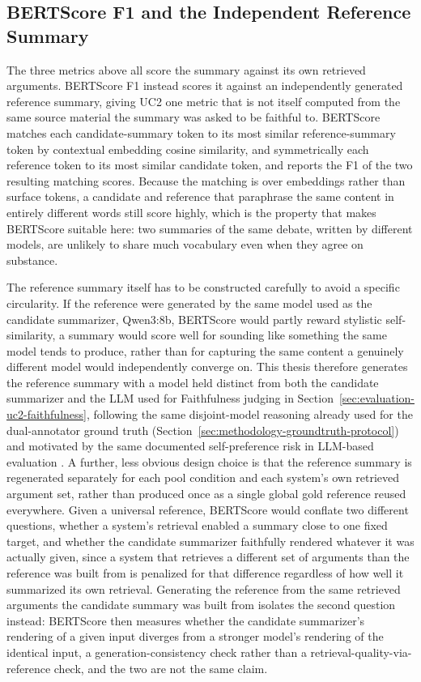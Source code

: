 \subsection{BERTScore F1 and the Independent Reference Summary}
\label{sec:evaluation-uc2-bertscore}

The three metrics above all score the summary against its own retrieved arguments. BERTScore F1
\cite{zhang2020bertscore} instead scores it against an independently generated reference summary,
giving UC2 one metric that is not itself computed from the same source material the summary was
asked to be faithful to. BERTScore matches each candidate-summary token to its most similar
reference-summary token by contextual embedding cosine similarity, and symmetrically each reference
token to its most similar candidate token, and reports the F1 of the two resulting matching scores.
Because the matching is over embeddings rather than surface tokens, a candidate and reference that
paraphrase the same content in entirely different words still score highly, which is the property
that makes BERTScore suitable here: two summaries of the same debate, written by different models,
are unlikely to share much vocabulary even when they agree on substance.

The reference summary itself has to be constructed carefully to avoid a specific circularity. If the
reference were generated by the same model used as the candidate summarizer, Qwen3:8b, BERTScore
would partly reward stylistic self-similarity, a summary would score well for sounding like
something the same model tends to produce, rather than for capturing the same content a genuinely
different model would independently converge on. This thesis therefore generates the reference
summary with a model held distinct from both the candidate summarizer and the LLM used for
Faithfulness judging in Section~\ref{sec:evaluation-uc2-faithfulness}, following the same
disjoint-model reasoning already used for the dual-annotator ground truth
(Section~\ref{sec:methodology-groundtruth-protocol}) and motivated by the same documented
self-preference risk in LLM-based evaluation \cite{panickssery2024selfpref}. A further, less obvious
design choice is that the reference summary is regenerated separately for each pool condition and
each system's own retrieved argument set, rather than produced once as a single global gold
reference reused everywhere. Given a universal reference, BERTScore would conflate two different
questions, whether a system's retrieval enabled a summary close to one fixed target, and whether the
candidate summarizer faithfully rendered whatever it was actually given, since a system that
retrieves a different set of arguments than the reference was built from is penalized for that
difference regardless of how well it summarized its own retrieval. Generating the reference from the
same retrieved arguments the candidate summary was built from isolates the second question instead:
BERTScore then measures whether the candidate summarizer's rendering of a given input diverges from
a stronger model's rendering of the identical input, a generation-consistency check rather than a
retrieval-quality-via-reference check, and the two are not the same claim.

